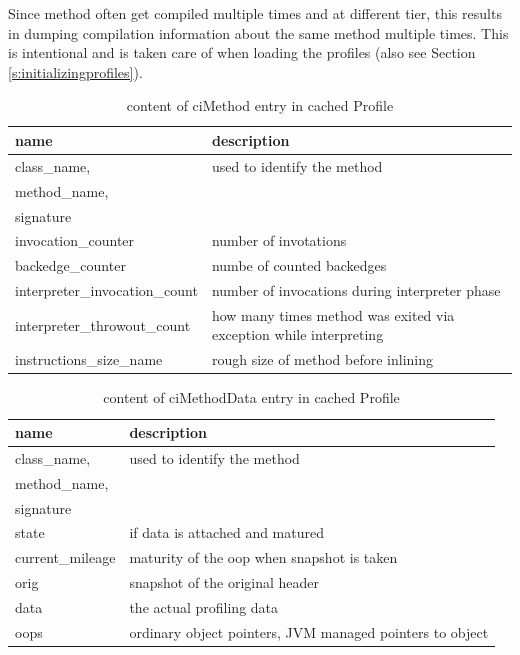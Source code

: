 Since method often get compiled multiple times and at different tier, this results in dumping compilation information about the same method multiple times. This is intentional and is taken care of when loading the profiles (also see Section \ref{s:initializingprofiles}).
\begin{table}[ht!]
  \caption{content of ciMethod entry in cached Profile}
  \label{t:cimethod}
  \begin{center}
    \begin{tabular}{|p{5cm}|p{10.5cm}|} 
      \hline
       \textbf{name} & \textbf{description} \\ \hline\hline
       class\_name,& used to identify the method\\
       method\_name, & \\
       signature & \\ \hline
       invocation\_counter & number of invotations\\ \hline
       backedge\_counter & numbe of counted backedges\\ \hline
       interpreter\_invocation\_count & number of invocations during interpreter phase\\ \hline
       interpreter\_throwout\_count & how many times method was exited via exception while interpreting\\ \hline
       instructions\_size\_name & rough size of method before inlining\\ \hline
    \end{tabular}
  \end{center}
\end{table}
\begin{table}[ht!]
  \caption{content of ciMethodData entry in cached Profile}
  \label{t:cimethoddata}
  \begin{center}
    \begin{tabular}{|p{5cm}|p{10.5cm}|} 
      \hline
       \textbf{name} & \textbf{description} \\ \hline\hline
       class\_name,& used to identify the method\\
       method\_name, & \\
       signature & \\ \hline
       state & if data is attached and matured\\ \hline
       current\_mileage & maturity of the oop when snapshot is taken\\ \hline
       orig &  snapshot of the original header\\ \hline
       data & the actual profiling data\\ \hline
       oops & ordinary object pointers, JVM managed pointers to object\\ \hline        
    \end{tabular}
  \end{center}
\end{table}
